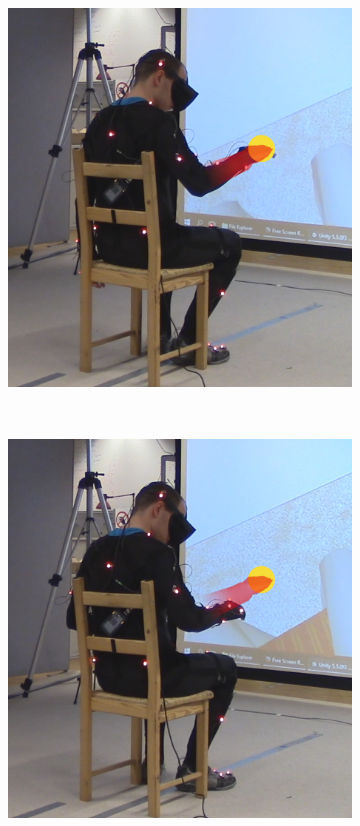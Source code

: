 \begin{figure}[h]
    \centering
    \begin{subfigure}[b]{.4\textwidth}
        \includegraphics[width=\textwidth]{Figures/handPositionTargetNoDist.png}
    \end{subfigure}
    ~
    \begin{subfigure}[b]{.4\textwidth}
        \includegraphics[width=\textwidth]{Figures/handPositionTarget.png}
    \end{subfigure}


\end{figure}
